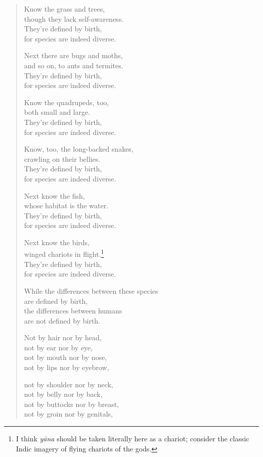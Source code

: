 \documentclass[12pt,openany]{book}%
\begin{document}
\begin{verse}
Know the grass and trees, \\
though they lack self-awareness. \\
They’re defined by birth, \\
for species are indeed diverse. 

Next there are bugs and moths, \\
and so on, to ants and termites. \\
They’re defined by birth, \\
for species are indeed diverse. 

Know the quadrupeds, too, \\
both small and large. \\
They’re defined by birth, \\
for species are indeed diverse. 

Know, too, the long-backed snakes, \\
crawling on their bellies. \\
They’re defined by birth, \\
for species are indeed diverse. 

Next know the fish, \\
whose habitat is the water. \\
They’re defined by birth, \\
for species are indeed diverse. 

Next know the birds, \\
winged chariots in flight.\footnote{I think \textit{\textsanskrit{yāna}} should be taken literally here as a chariot; consider the classic Indic imagery of flying chariots of the gods. } \\
They’re defined by birth, \\
for species are indeed diverse. 

While the differences between these species \\
are defined by birth, \\
the differences between humans \\
are not defined by birth. 

Not by hair nor by head, \\
not by ear nor by eye, \\
not by mouth nor by nose, \\
not by lips nor by eyebrow, 

not by shoulder nor by neck, \\
not by belly nor by back, \\
not by buttocks nor by breast, \\
not by groin nor by genitals, 


\end{verse}
\end{document}

